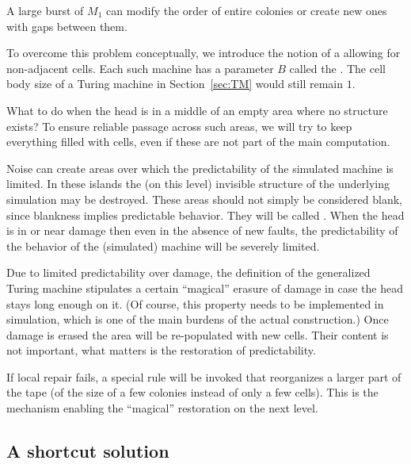 \documentclass[12pt]{memoir}
\def\B{B}
\begin{document}
\begin{bullets}

\item A large burst of \( M_1 \) can modify the order of
entire colonies or create new ones with gaps between them.

To overcome this problem conceptually, we 
introduce the notion of a 
allowing for non-adjacent cells.
Each such machine has a parameter \( \B \) called the .
The cell body size of a Turing machine in Section~\ref{sec:TM} would still remain
\( 1 \).

    \item What to do when the head is in a middle of an empty area
       where no structure exists?
To ensure reliable passage across such areas,
we will try to keep everything filled with cells, even if these are
not part of the main computation.

    \item Noise can create areas over
     which the predictability of the simulated machine is limited.
     In these islands the (on this level) invisible structure
     of the underlying simulation may be destroyed.
     These areas should not simply be considered blank, since
     blankness implies predictable behavior.
     They will be called .
     When the head is in or near damage then even in the absence of new faults,
     the predictability of the behavior of the (simulated) machine will be
     severely limited.

\item Due to limited predictability over damage, the definition of the generalized
Turing machine stipulates a certain ``magical'' erasure of damage in case the
head stays long enough on it.
(Of course, this property needs to be implemented in simulation, which is one of the
main burdens of the actual construction.)
Once damage is erased the area will be re-populated with new cells.
Their content is not important, what matters is the restoration of predictability.

        \item If local repair fails, a special rule will be invoked that reorganizes a
larger part of the tape (of the size of a few colonies instead of only a few cells).
This is the mechanism enabling the ``magical'' restoration on the next level.

\end{bullets}

\subsection{A shortcut solution}
\end{document}
